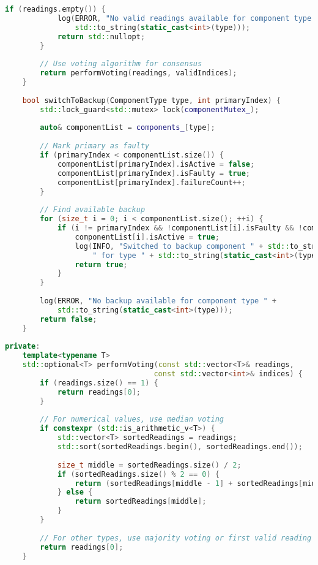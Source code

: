 \begin{lstlisting}[language=C++, caption=Redundant System Architecture]
        if (readings.empty()) {
            log(ERROR, "No valid readings available for component type " + 
                std::to_string(static_cast<int>(type)));
            return std::nullopt;
        }
        
        // Use voting algorithm for consensus
        return performVoting(readings, validIndices);
    }
    
    bool switchToBackup(ComponentType type, int primaryIndex) {
        std::lock_guard<std::mutex> lock(componentMutex_);
        
        auto& componentList = components_[type];
        
        // Mark primary as faulty
        if (primaryIndex < componentList.size()) {
            componentList[primaryIndex].isActive = false;
            componentList[primaryIndex].isFaulty = true;
            componentList[primaryIndex].failureCount++;
        }
        
        // Find available backup
        for (size_t i = 0; i < componentList.size(); ++i) {
            if (i != primaryIndex && !componentList[i].isFaulty && !componentList[i].isActive) {
                componentList[i].isActive = true;
                log(INFO, "Switched to backup component " + std::to_string(i) + 
                    " for type " + std::to_string(static_cast<int>(type)));
                return true;
            }
        }
        
        log(ERROR, "No backup available for component type " + 
            std::to_string(static_cast<int>(type)));
        return false;
    }
    
private:
    template<typename T>
    std::optional<T> performVoting(const std::vector<T>& readings, 
                                  const std::vector<int>& indices) {
        if (readings.size() == 1) {
            return readings[0];
        }
        
        // For numerical values, use median voting
        if constexpr (std::is_arithmetic_v<T>) {
            std::vector<T> sortedReadings = readings;
            std::sort(sortedReadings.begin(), sortedReadings.end());
            
            size_t middle = sortedReadings.size() / 2;
            if (sortedReadings.size() % 2 == 0) {
                return (sortedReadings[middle - 1] + sortedReadings[middle]) / 2;
            } else {
                return sortedReadings[middle];
            }
        }
        
        // For other types, use majority voting or first valid reading
        return readings[0];
    }
    

\end{lstlisting}
